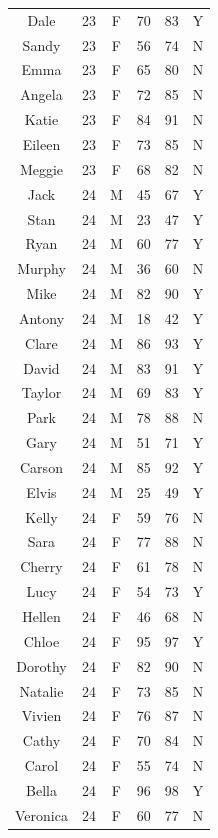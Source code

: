 \documentclass[a4paper, 12pt,twoside]{book}
\newenvironment{knitrout}{}{} %
\begin{document}
\begin{center}
\begin{knitrout}
\begin{table}[!h]
{\begin{tabular}[t]{cccccc}
Dale & 23 & F & 70 & 83 & Y\\
Sandy & 23 & F & 56 & 74 & N\\
Emma & 23 & F & 65 & 80 & N\\
Angela & 23 & F & 72 & 85 & N\\
Katie & 23 & F & 84 & 91 & N\\
Eileen & 23 & F & 73 & 85 & N\\
Meggie & 23 & F & 68 & 82 & N\\
Jack & 24 & M & 45 & 67 & Y\\
Stan & 24 & M & 23 & 47 & Y\\
Ryan & 24 & M & 60 & 77 & Y\\
Murphy & 24 & M & 36 & 60 & N\\
Mike & 24 & M & 82 & 90 & Y\\
Antony & 24 & M & 18 & 42 & Y\\
Clare & 24 & M & 86 & 93 & Y\\
David & 24 & M & 83 & 91 & Y\\
Taylor & 24 & M & 69 & 83 & Y\\
Park & 24 & M & 78 & 88 & N\\
Gary & 24 & M & 51 & 71 & Y\\
Carson & 24 & M & 85 & 92 & Y\\
Elvis & 24 & M & 25 & 49 & Y\\
Kelly & 24 & F & 59 & 76 & N\\
Sara & 24 & F & 77 & 88 & N\\
Cherry & 24 & F & 61 & 78 & N\\
Lucy & 24 & F & 54 & 73 & Y\\
Hellen & 24 & F & 46 & 68 & N\\
Chloe & 24 & F & 95 & 97 & Y\\
Dorothy & 24 & F & 82 & 90 & N\\
Natalie & 24 & F & 73 & 85 & N\\
Vivien & 24 & F & 76 & 87 & N\\
Cathy & 24 & F & 70 & 84 & N\\
Carol & 24 & F & 55 & 74 & N\\
Bella & 24 & F & 96 & 98 & Y\\
Veronica & 24 & F & 60 & 77 & N\\
\bottomrule
\end{tabular}
}
\end{table}

\end{knitrout}
\end{center}
\end{document}
